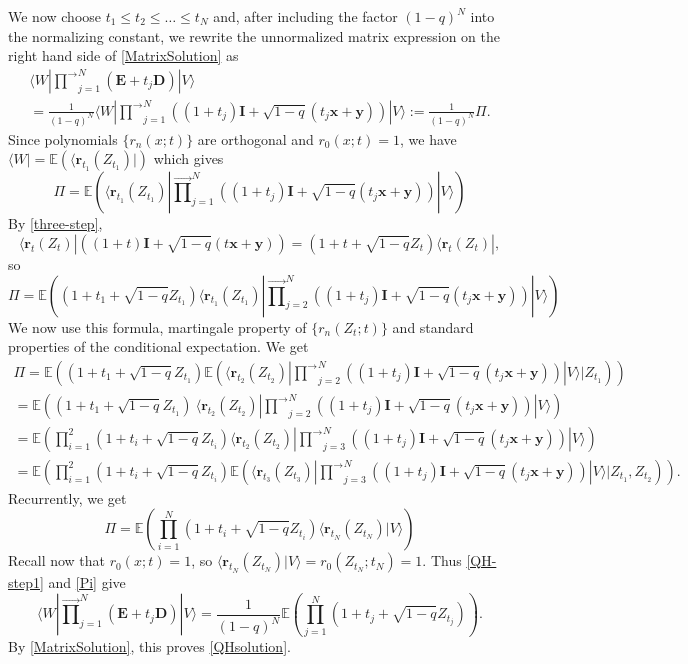 \documentclass{amsart}
\theoremstyle{definition}
\theoremstyle{remark}
\theoremstyle{remark}
\theoremstyle{definition}
\numberwithin{equation}{section}
\begin{document}
{} We now choose $t_1\leq t_2\leq\dots\leq t_N$ and, after including the factor $ (1-q)^N$ into the normalizing constant, we  rewrite
 the unnormalized matrix expression on the
right hand side of \eqref{MatrixSolution} as
\begin{multline}
  \label{QH-step1}
\langle W| \vec{\prod}_{j=1}^N({\mathbf{E}}+t_j{\mathbf{D}})|V\rangle\\=
 \frac{1}{(1-q)^N}\langle W|  \vec{\prod}_{j=1}^N((1+t_j){\mathbf{I}}+\sqrt{1-q}(t_j{\mathbf{x}}+{\mathbf{y}}))|V\rangle:= \frac{1}{(1-q)^N}\Pi.
\end{multline}
Since polynomials $\{r_n(x;t)\}$ are orthogonal and $r_0(x;t)=1$, we have $\langle W|={\mathds{E}}(\langle \mathbf{r}_{t_1}(Z_{t_1})|)$ which gives
$$
\Pi
 = {\mathds{E}}\left(\langle \mathbf{r}_{t_1}(Z_{t_1})| \vec{\prod}_{j=1}^N((1+t_j){\mathbf{I}}+\sqrt{1-q}(t_j{\mathbf{x}}+{\mathbf{y}}))|V\rangle\right)
$$
By \eqref{three-step},
$$\langle \mathbf{r}_{t}(Z_{t})|  \left((1+t){\mathbf{I}}+\sqrt{1-q}(t{\mathbf{x}}+{\mathbf{y}})\right)= (1+t+\sqrt{1-q}Z_{t}) \langle \mathbf{r}_{t}(Z_{t})|,$$
so
$$
\Pi
 = {\mathds{E}}\left((1+t_1+\sqrt{1-q}Z_{t_1}) \langle \mathbf{r}_{t_1}(Z_{t_1})|  \vec{\prod}_{j=2}^N((1+t_j){\mathbf{I}}+\sqrt{1-q}(t_j{\mathbf{x}}+{\mathbf{y}}))|V\rangle\right)
$$
We now use this formula,   martingale property of $\{r_n(Z_t;t)\}$ and
 standard properties of the conditional expectation. We get
\begin{multline*}
\Pi={\mathds{E}}\left((1+t_1+\sqrt{1-q}Z_{t_1}) {\mathds{E}}(\langle \mathbf{r}_{t_2}(Z_{t_2})|  \vec{\prod}_{j=2}^N((1+t_j){\mathbf{I}}+\sqrt{1-q}(t_j{\mathbf{x}}+{\mathbf{y}}))|V\rangle|Z_{t_1})\right)
\\
={\mathds{E}}\left((1+t_1+\sqrt{1-q}Z_{t_1}) \ \langle \mathbf{r}_{t_2}(Z_{t_2})|  \vec{\prod}_{j=2}^N((1+t_j){\mathbf{I}}+\sqrt{1-q}(t_j{\mathbf{x}}+{\mathbf{y}}))|V\rangle \right)
\\
={\mathds{E}}\left(\prod_{i=1}^2(1+t_i+\sqrt{1-q}Z_{t_i}) \langle \mathbf{r}_{t_2}(Z_{t_2})|  \vec{\prod}_{j=3}^N((1+t_j){\mathbf{I}}+\sqrt{1-q}(t_j{\mathbf{x}}+{\mathbf{y}}))|V\rangle\right)\\
={\mathds{E}}\left(\prod_{i=1}^2(1+t_i+\sqrt{1-q}Z_{t_i}) {\mathds{E}}(\langle \mathbf{r}_{t_3}(Z_{t_3})|  \vec{\prod}_{j=3}^N((1+t_j){\mathbf{I}}+\sqrt{1-q}(t_j{\mathbf{x}}+{\mathbf{y}}))|V\rangle|Z_{t_1},Z_{t_2})\right).
\end{multline*}
Recurrently, 
we get
\begin{equation}\label{Pi}
\Pi =
{\mathds{E}}\left(\prod_{i=1}^N(1+t_i+\sqrt{1-q}Z_{t_i})  \langle \mathbf{r}_{t_N}(Z_{t_N})|V\rangle\right)
\end{equation}
Recall now that $r_0(x;t)=1$, so $\langle \mathbf{r}_{t_N}(Z_{t_N})|V\rangle=r_0(Z_{t_N};t_N)=1$. Thus \eqref{QH-step1} and \eqref{Pi} give
$$\langle W| \vec{\prod}_{j=1}^N({\mathbf{E}}+t_j{\mathbf{D}})|V\rangle= \frac{1}{(1-q)^N}{\mathds{E}}\left(\prod_{j=1}^N \left(1+t_j+\sqrt{1-q}Z_{t_j}\right)\right).$$
By \eqref{MatrixSolution}, this proves \eqref{QHsolution}.
\end{document}
